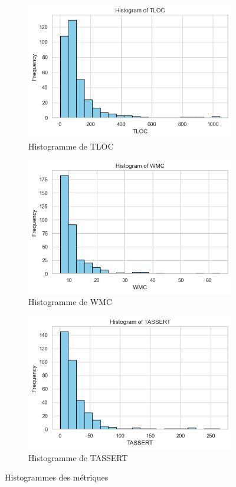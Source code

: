 \documentclass[10pt]{article}
\begin{document}
\begin{figure}[h]
\centering
\begin{subfigure}{.31\textwidth}
  \centering
  \includegraphics[width=\linewidth]{Histogram-TLOC.png}
  \caption{Histogramme de TLOC}
\end{subfigure}%
\hfill
\begin{subfigure}{.31\textwidth}
  \centering
  \includegraphics[width=\linewidth]{Histogram-WMC.png}
  \caption{Histogramme de WMC}
\end{subfigure}%
\hfill
\begin{subfigure}{.31\textwidth}
  \centering
  \includegraphics[width=\linewidth]{Histogram-Tassert.png}
  \caption{Histogramme de TASSERT}
\end{subfigure}
\caption{Histogrammes des métriques}
\end{figure}
\end{document}
